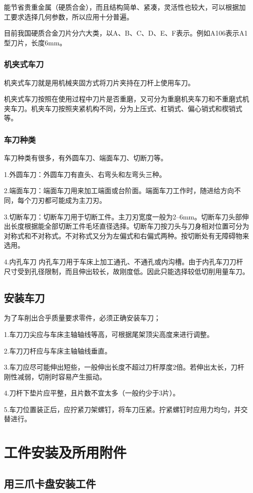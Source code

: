 \documentclass{ctexbook}
\begin{document}
能节省贵重金属（硬质合金），而且结构简单、紧凑，灵活性也较大，可以根据加工要求选择几何参数，所以应用十分普遍。

目前我国硬质合金刀片分六大类，以A、B、C、D、E、F表示。例如A106表示A1型刀片，长度6mm。
\subsubsection{机夹式车刀}
机夹式车刀就是用机械夹固方式将刀片夹持在刀杆上使用车刀。

机夹式车刀按照在使用过程中刀片是否重磨，又可分为重磨机夹车刀和不重磨式机夹车刀。机夹车刀按照夹紧机构不同，分为上压式、杠销式、偏心销式和楔销式等。
\subsubsection{车刀种类}
车刀种类有很多，有外圆车刀、端面车刀、切断刀等。

1.外圆车刀：外圆车刀有直头、右弯头和左弯头三种。

2.端面车刀：端面车刀用来加工端面或台阶面。端面车刀工作时，随进给方向不同，每个刀刃都可能成为主刀刃。

3.切断车刀：切断车刀用于切断工件。主刀刃宽度一般为2--6mm。切断车刀头部伸出长度根据能全部切断工件毛坯直径选择。切断车刀按刀头与刀身相对位置可分为对称式和不对称式。不对称式又分为左偏式和右偏式两种。按切断处有无障碍物来选用。

4.内孔车刀
内孔车刀用于车床上加工通孔、不通孔或内沟槽。由于内孔车刀刀杆尺寸受到孔径限制，而且伸出较长，故刚度低。因此只能选择较低切削用量车刀。
\subsection{安装车刀}
为了车削出合乎质量要求零件，必须正确安装车刀；

1.车刀刀尖应与车床主轴轴线等高，可根据尾架顶尖高度来进行调整。

2.车刀刀杆应与车床主轴轴线垂直。

3.车刀应尽可能伸出短些，一般伸出长度不超过刀杆厚度2倍。若伸出太长，刀杆刚性减弱，切削时容易产生振动。

4.刀杆下垫片应平整，且片数不宜太多（一般约少于3片）。

5.车刀位置装正后，应拧紧刀架螺钉，将车刀压紧。拧紧螺钉时应用力均匀，并交替进行。
\section{工件安装及所用附件}
\subsection{用三爪卡盘安装工件}
\end{document}
